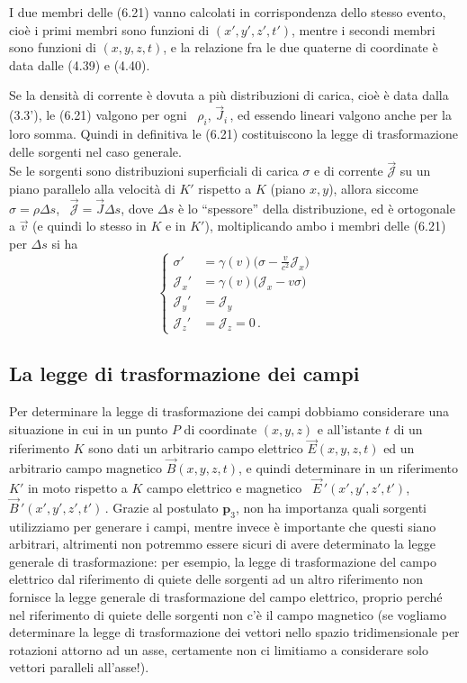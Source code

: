 I due membri delle (6.21) vanno calcolati in corrispondenza dello stesso evento,
cio\`e i primi membri sono funzioni di $(x',y',z',t')$, mentre i secondi membri
sono funzioni di $(x,y,z,t)$, e la relazione fra le due quaterne di coordinate
\`e data dalle (4.39) e (4.40).

Se la densit\`a di corrente \`e dovuta a pi\`u distribuzioni di carica, cio\`e
\`e data dalla (3.3'), le (6.21) valgono per ogni \ $\rho_i$, $\vec J_i$\,, ed
essendo lineari valgono anche per la loro somma. Quindi in definitiva le (6.21)
costituiscono la legge di trasformazione delle sorgenti nel caso generale.\\
Se le sorgenti sono distribuzioni superficiali di carica $\sigma$ e di corrente
$\vec{\mathcal J}$ su un piano parallelo alla velocit\`a di $K'$ rispetto a $K$
(piano $x,y$), allora siccome $\sigma=\rho\Delta s$,
\ $\vec{\mathcal J}=\vec J\Delta s$, dove $\Delta s$ \`e lo ``spessore'' della
distribuzione, ed \`e ortogonale a $\vec v$ (e quindi lo stesso in $K$ e in
$K'$), moltiplicando ambo i membri delle (6.21) per $\Delta s$ si ha
\begin{equation}
  \left\{\begin{aligned}
    \sigma'&=\gamma(v)\big(\sigma-\frac{v}{c^2}\mathcal J_x\big)\\
    \mathcal J_x'&=\gamma(v)\big(\mathcal J_x-v\sigma\big)\\
    \mathcal J_y'&=\mathcal J_y\\
    \mathcal J_z'&=\mathcal J_z=0\,.
  \end{aligned}\right.
  \tag{6.22}
\end{equation}

\subsection{La legge di trasformazione dei campi}

Per determinare la legge di trasformazione dei campi dobbiamo considerare una
situazione in cui in un punto $P$ di coordinate $(x,y,z)$ e all'istante $t$ di
un riferimento $K$ sono dati un arbitrario campo elettrico $\vec E(x,y,z,t)$ ed
un arbitrario campo magnetico $\vec B(x,y,z,t)$, e quindi determinare in un
riferimento $K'$ in moto rispetto a $K$ campo elettrico e magnetico
\ $\vec E\,'(x',y',z',t')$, \ $\vec B\,'(x',y',z',t')$\,. Grazie al postulato
$\mathbf p_3$, non ha importanza quali sorgenti utilizziamo per generare i
campi, mentre invece \`e importante che questi siano arbitrari, altrimenti non
potremmo essere sicuri di avere determinato la legge generale di trasformazione:
per esempio, la legge di trasformazione del campo elettrico dal riferimento di
quiete delle sorgenti ad un altro riferimento non fornisce la legge generale di
trasformazione del campo elettrico, proprio perch\'e nel riferimento di quiete
delle sorgenti non c'\`e il campo magnetico (se vogliamo determinare la legge di
trasformazione dei vettori nello spazio tridimensionale per rotazioni attorno ad
un asse, certamente non ci limitiamo a considerare solo vettori paralleli
all'asse!).

